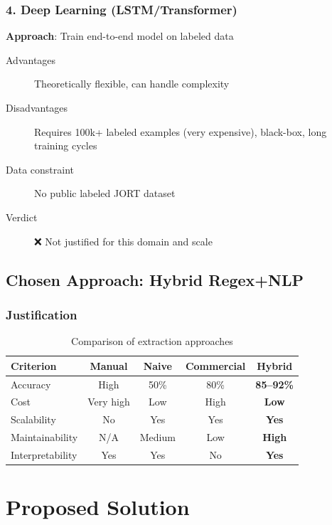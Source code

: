\documentclass[12pt,a4paper]{report}
\begin{document}
\subsection{4. Deep Learning (LSTM/Transformer)}

\textbf{Approach}: Train end-to-end model on labeled data

\begin{description}
    \item[Advantages] Theoretically flexible, can handle complexity
    \item[Disadvantages] Requires 100k+ labeled examples (very expensive), black-box, long training cycles
    \item[Data constraint] No public labeled JORT dataset
    \item[Verdict] ❌ Not justified for this domain and scale
\end{description}

\section{Chosen Approach: Hybrid Regex+NLP}

\subsection{Justification}

\begin{table}[H]
\centering
\begin{tabular}{|p{3cm}|c|c|c|c|}
\hline
\textbf{Criterion} & \textbf{Manual} & \textbf{Naive} & \textbf{Commercial} & \textbf{Hybrid} \\
\hline
Accuracy & High & 50\% & 80\% & \textbf{85--92\%} \\
Cost & Very high & Low & High & \textbf{Low} \\
Scalability & No & Yes & Yes & \textbf{Yes} \\
Maintainability & N/A & Medium & Low & \textbf{High} \\
Interpretability & Yes & Yes & No & \textbf{Yes} \\
\hline
\end{tabular}
\caption{Comparison of extraction approaches}
\end{table}

\chapter{Proposed Solution}
\end{document}
